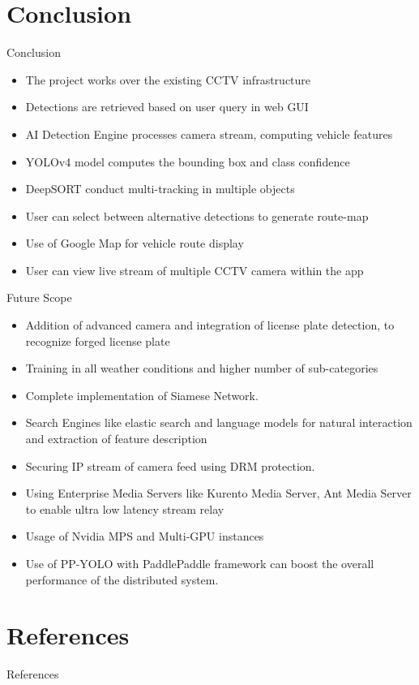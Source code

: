 \documentclass{beamer}
\begin{document}
	\section{Conclusion}
	\begin{frame}{Conclusion}
		\begin{itemize}
			\item The project works over the existing CCTV infrastructure
			\item Detections are retrieved based on user query in web GUI
			\item AI Detection Engine processes camera stream, computing vehicle features
			\item YOLOv4 model computes the bounding box and class confidence
			\item DeepSORT conduct multi-tracking in multiple objects
			\item User can select between alternative detections to generate route-map
			\item Use of Google Map for vehicle route display
			\item User can view live stream of multiple CCTV camera within the app
		\end{itemize}
	\end{frame}
	\begin{frame}[allowframebreaks]{Future Scope}
		\begin{spacing}{1.5}
		\begin{itemize}
			\item Addition of advanced camera and integration of license plate detection, to recognize forged license plate
			\item Training in all weather conditions and higher number of sub-categories
			\item Complete implementation of Siamese Network. 
			\item Search Engines like elastic search and language models for natural interaction and extraction of feature description 		
			\item Securing IP stream of camera feed using DRM protection.
			\item Using Enterprise Media Servers like Kurento Media Server, Ant Media Server to enable ultra low latency stream relay
			\item Usage of Nvidia MPS and Multi-GPU instances
			\item Use of PP-YOLO with PaddlePaddle framework can boost the overall performance of the distributed system.
		\end{itemize}
		\end{spacing}
	\end{frame}
\section{References}
\begin{frame}[allowframebreaks]{References}
	\nocite{*}
	
	
\end{frame}
\end{document}
